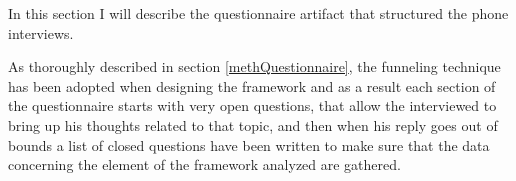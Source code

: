 In this section I will describe the questionnaire artifact that structured the phone interviews.

As thoroughly described in section \ref{methQuestionnaire}, the funneling technique has been adopted when designing the framework and as a result each section of the questionnaire starts with very open questions, that allow the interviewed to bring up his thoughts related to that topic, and then when his reply goes out of bounds a list of closed questions have been written to make sure that the data concerning the element of the framework analyzed are gathered. \\







\\ %